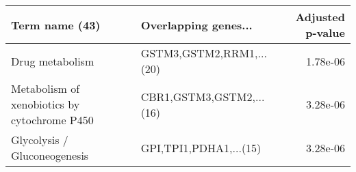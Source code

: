 \begin{tabular}{llr}
\toprule
                              Term name (43) &     Overlapping genes... &  Adjusted p-value \\
\midrule
                             Drug metabolism & GSTM3,GSTM2,RRM1,...(20) &          1.78e-06 \\
Metabolism of xenobiotics by cytochrome P450 & CBR1,GSTM3,GSTM2,...(16) &          3.28e-06 \\
                Glycolysis / Gluconeogenesis &   GPI,TPI1,PDHA1,...(15) &          3.28e-06 \\
\bottomrule
\end{tabular}
